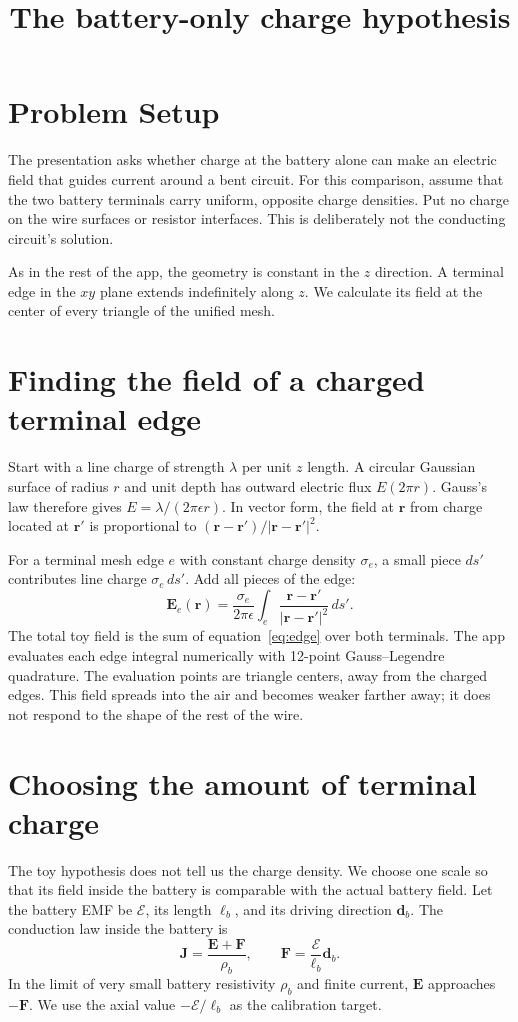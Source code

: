 \documentclass[11pt]{article}
\title{The battery-only charge hypothesis}
\author{}
\date{}
\begin{document}
\maketitle

\section{Problem Setup}
The presentation asks whether charge at the battery alone can make an
electric field that guides current around a bent circuit. For this
comparison, assume that the two battery terminals carry uniform,
opposite charge densities. Put no charge on the wire surfaces or
resistor interfaces. This is deliberately not the conducting
circuit's solution.

As in the rest of the app, the geometry is constant in the $z$
direction. A terminal edge in the $xy$ plane extends indefinitely
along $z$. We calculate its field at the center of every triangle
of the unified mesh.

\section{Finding the field of a charged terminal edge}
Start with a line charge of strength $\lambda$ per unit $z$ length.
A circular Gaussian surface of radius $r$ and unit depth has
outward electric flux $E(2\pi r)$. Gauss's law therefore gives
$E=\lambda/(2\pi\epsilon r)$. In vector form, the field at
$\bm r$ from charge located at $\bm r'$ is proportional to
$(\bm r-\bm r')/|\bm r-\bm r'|^2$.

For a terminal mesh edge $e$ with constant charge density
$\sigma_e$, a small piece $ds'$ contributes line charge
$\sigma_e\,ds'$. Add all pieces of the edge:
\begin{equation}
 \bm E_e(\bm r)=
 \frac{\sigma_e}{2\pi\epsilon}
 \int_e
 \frac{\bm r-\bm r'}{|\bm r-\bm r'|^2}\,ds'.
 \label{eq:edge}
\end{equation}
The total toy field is the sum of equation~\eqref{eq:edge}
over both terminals. The app evaluates each edge integral
numerically with 12-point Gauss--Legendre quadrature. The
evaluation points are triangle centers, away from the charged
edges. This field spreads into the air and becomes weaker farther
away; it does not respond to the shape of the rest of the wire.

\section{Choosing the amount of terminal charge}
The toy hypothesis does not tell us the charge density. We choose
one scale so that its field inside the battery is comparable with
the actual battery field. Let the battery EMF be $\mathcal E$,
its length $\ell_b$, and its driving direction $\bm d_b$.
The conduction law inside the battery is
\begin{equation}
 \bm J=\frac{\bm E+\bm F}{\rho_b},\qquad
 \bm F=\frac{\mathcal E}{\ell_b}\bm d_b.
\end{equation}
In the limit of very small battery resistivity $\rho_b$ and finite
current, $\bm E$ approaches $-\bm F$. We use the axial value
$-\mathcal E/\ell_b$ as the calibration target.
\end{document}
